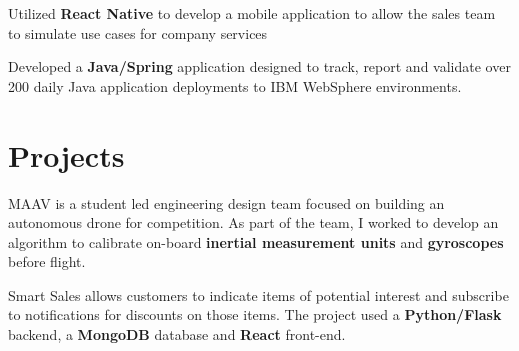 \documentclass[letterpaper]{deedy-resume} %
\begin{document}
\begin{minipage}[t]{0.66\textwidth}
\sectionspace %



\begin{tightitemize}
\item Utilized {\bf React Native} to develop a mobile application to allow the sales team to simulate use cases for company services
\item Developed a {\bf Java/Spring} application designed to track, report and validate over 200 daily Java application deployments to IBM WebSphere environments.
\end{tightitemize}

\sectionspace %


\section{Projects}


MAAV is a student led engineering design team focused on building an autonomous drone for competition. As part of the team, I worked to develop an algorithm to calibrate on-board {\bf inertial measurement units} and {\bf gyroscopes} before flight.

\sectionspace %



Smart Sales allows customers to indicate items of potential interest and subscribe to notifications for discounts on those items. The project used a {\bf Python/Flask} backend, a {\bf MongoDB} database and {\bf React} front-end.

\sectionspace %




\end{minipage}
\end{document}
